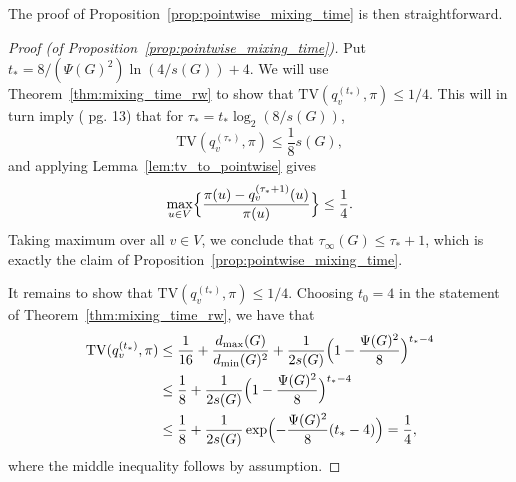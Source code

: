 \documentclass{article}
\newcommand{\1}{\mathbf{1}}
\theoremstyle{definition}
\theoremstyle{remark}
\begin{document}
The proof of Proposition~\ref{prop:pointwise_mixing_time} is then straightforward.
\begin{proof}[Proof (of Proposition~\ref{prop:pointwise_mixing_time})]
	Put $t_{\ast} = 8/(\Psi(G)^2) \ln(4/s(G)) + 4$. We will use Theorem~\ref{thm:mixing_time_rw} to show that $\mathrm{TV}(q_v^{(t_{\ast})},\pi) \leq 1/4$. This will in turn imply (\cite{montenegro2002} pg. 13) that for $\tau_{\ast} = t_{\ast} \log_2(8/s(G))$,
	\begin{equation*}
	\mathrm{TV}(q_v^{(\tau_{\ast})},\pi) \leq \frac{1}{8}s(G),
	\end{equation*}
	and applying Lemma~\ref{lem:tv_to_pointwise} gives
	\begin{equation*}
	\max_{u \in V} \Bigl\{\frac{\pi(u) - q_v^{(\tau_{\ast} + 1)}(u)}{\pi(u)}\Bigr\} \leq \frac{1}{4}.
	\end{equation*}
	Taking maximum over all $v \in V$, we conclude that $\tau_{\infty}(G) \leq \tau_{\ast} + 1$, which is exactly the claim of Proposition~\ref{prop:pointwise_mixing_time}.
	
	It remains to show that $\mathrm{TV}(q_v^{(t_{\ast})},\pi) \leq 1/4$. Choosing $t_0 = 4$ in the statement of Theorem~\ref{thm:mixing_time_rw}, we have that
	\begin{align*}
	\mathrm{TV}(q_v^{(t_{\ast})},\pi) & \leq \frac{1}{16} + \frac{d_{\max}(G)}{d_{\min}(G)^2} + \frac{1}{2s(G)} \Bigl(1 - \frac{\Psi(G)^2}{8}\Bigr)^{t_{\ast} - 4} \\
	& \leq \frac{1}{8} + \frac{1}{2s(G)} \Bigl(1 - \frac{\Psi(G)^2}{8}\Bigr)^{t_{\ast} - 4} \\
	& \leq \frac{1}{8} + \frac{1}{2s(G)} \exp\Bigl(-\frac{\Psi(G)^2}{8}(t_{\ast} - 4)\Bigr) = \frac{1}{4},
	\end{align*}
	where the middle inequality follows by assumption.
\end{proof}
\end{document}
